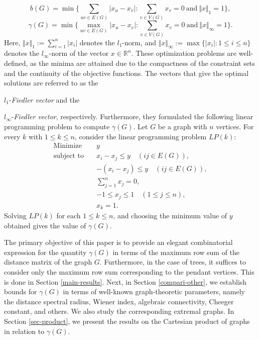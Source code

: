 \documentclass[12pt]{article}
\begin{document}
	$$
	b(G)=\min\biggl\{\sum_{uv \in E(G)}\vert x_u - x_v\vert: \sum_{v \in V(G)}x_v=0~\mbox{and}~ \Vert x \Vert_{1}=1\biggl\},
	$$
	$$
	\gamma(G)=\min\biggl\{\max_{uv \in E(G)}\vert x_u - x_v\vert: \sum_{v \in V(G)} x_v =0 ~\mbox{and}~\Vert x \Vert _{\infty}=1\biggl\}.
	$$
	Here, $\Vert x \Vert_1 := \sum\limits_{i=1}^n |x_i|$ denotes the $l_1$-norm, and $\Vert x \Vert_\infty := \max \{ |x_i| : 1 \leq i \leq n \}$ denotes the $l_\infty$-norm of the vector $x \in \mathbb{R}^n$. These optimization problems are well-defined, as the minima are attained due to the compactness of the constraint sets and the continuity of the objective functions. The vectors that give the optimal solutions are referred to as the {$l_1$-\textit{Fiedler vector} and the {$l_\infty$-\textit{Fiedler vector}, respectively. Furthermore, they formulated the following linear programming problem to compute  $\gamma(G)$. Let $G$ be a graph with $n$ vertices. For every $k$ with $1 \leq k \leq n$, consider the linear programming problem $LP(k)$:
			\begin{align*}
				\text{Minimize} \quad & y \\
				\text{subject to} \quad & x_i - x_j \leq y \quad  (ij \in E(G)), \\
				& -(x_i - x_j) \leq y \quad (ij \in E(G)), \\
				& \sum_{j=1}^{n} x_j = 0, \\
				& -1 \leq x_j \leq 1 \quad (1\leq j \leq n), \\
				& x_k = 1.
			\end{align*}
			Solving $LP(k)$ for each $1 \leq k \leq n$, and choosing the minimum value of $y$ obtained gives the value of $\gamma(G)$. 
			
			The primary objective of this paper is to provide an elegant combinatorial expression for the quantity $\gamma(G)$ in terms of the maximum row sum of the distance matrix of the graph $G$. Furthermore, in the case of trees, it suffices to consider only the maximum row sum corresponding to the pendant vertices. This is done in Section \ref{main-results}. Next, in Section \ref{compari-other}, we establish bounds for $\gamma(G)$ in terms of well-known graph-theoretic parameters, namely the distance spectral radius, Wiener index, algebraic connectivity, Cheeger constant, and others. We also study the corresponding extremal graphs. In Section \ref{sec-product}, we present the results on the Cartesian product of graphs in relation to $\gamma (G)$. 
}}
\end{document}
